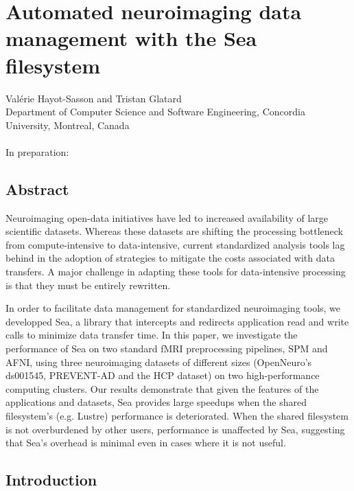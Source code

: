 \chapter{Automated neuroimaging data management with the Sea filesystem}\label{chapter:sea-neuro}

Val\'erie Hayot-Sasson and Tristan Glatard \\
\begingroup \footnotesize
Department of Computer Science and Software Engineering, Concordia University, Montreal, Canada \\
\endgroup 
\vspace{5pt} \\
In preparation: \\

\section{Abstract}

	Neuroimaging open-data initiatives have led to increased availability of large scientific datasets. 
  Whereas these datasets are shifting the processing bottleneck from compute-intensive to data-intensive,
  current standardized analysis tools lag behind in the adoption of strategies to mitigate the costs associated with
  data transfers. A major challenge in adapting these tools for data-intensive processing is that they must be entirely
  rewritten.
  
  In order to facilitate data management for standardized neuroimaging tools, we developped Sea, a library that intercepts
  and redirects application read and write calls to minimize data transfer time. In this paper, we investigate
  the performance of Sea on two standard fMRI preprocessing pipelines, SPM and AFNI, using three neuroimaging datasets of different sizes
  (OpenNeuro's ds001545, PREVENT-AD and the HCP dataset) on two high-performance computing clusters. Our results demonstrate that given the features of the applications and datasets,
  Sea provides large speedups when the shared filesystem's (e.g. Lustre) performance is deteriorated. When the shared filesystem is not overburdened by other users,
  performance is unaffected by Sea, suggesting that Sea's overhead is minimal even in cases where it is not useful.
  
  \section{Introduction}\label{sec:sea_neuro:introduction}
    
